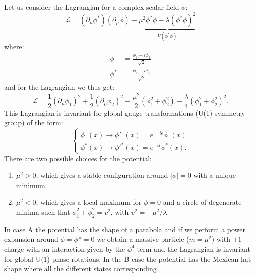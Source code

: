 Let us consider the Lagrangian for a complex scalar field $\phi$:
\begin{equation}
  \label{eq:25}
  \mathcal{L} = (\partial_{\mu} \phi^{*})(\partial_{\mu} \phi) -
  \underbrace{\mu^{2}\phi^{*}\phi - \lambda(\phi^{*}\phi)^{2}}_{V(\phi^{*}\phi)}
\end{equation}
where:
\begin{equation}
  \label{eq:26}
  \begin{split}
    \phi^{\phantom{*}} &= \frac{\phi_{1} + i \phi_{2}}{\sqrt{2}} \\
    \phi^{*} &= \frac{\phi_{1} - i \phi_{2}}{\sqrt{2}}
  \end{split}
\end{equation}
and for the Lagrangian we thus get:
\begin{equation}
  \label{eq:27}
  \mathcal{L} = \frac{1}{2} (\partial_{\mu} \phi_{1})^{2} +
  \frac{1}{2} ( \partial_{\mu} \phi_{2} )^{2} - \frac{\mu^{2}}{2} (
  \phi_{1}^{2} + \phi_{2}^{2} ) - \frac{\lambda}{4} ( \phi_{1}^{2} +
  \phi_{2}^{2} )^{2}.
\end{equation}
This Lagrangian is invariant for global gauge transformations (U(1) symmetry
group) of the form:
\begin{equation}
  \label{eq:28}
  \begin{cases}
    \phi^{\phantom{*}}(x) \rightarrow {\phi'}^{\phantom{*}}(x) = e^{\phantom{-} i
      \epsilon}
    \phi^{\phantom{*}}(x) \\
    \phi^{*} (x) \rightarrow {\phi'}^{*} (x) = e^{- i \epsilon} \phi^{*}(x).
  \end{cases}
\end{equation}
There are two possible choices for the potential:
\begin{enumerate}[A -]
\item $\mu^{2} > 0$, which gives a stable configuration around $|\phi| = 0$ with
  a unique minimum.
\item $\mu^{2} < 0$, which gives a local maximum for $\phi = 0$ and a circle of
  degenerate minima such that $\phi_{1}^{2} + \phi_{2}^{2} = v^{2}$, with
  $v^{2} = - \mu^{2} / \lambda$.
\end{enumerate}
In case A the potential has the shape of a parabola and if we perform a power
expansion around $\phi = \phi* = 0$ we obtain a massive particle ($m = \mu^2$)
with $\pm 1$ charge with an interaction given by the $\phi^4$ term and the
Lagrangian is invariant for global U(1) phase rotations. In the B case the
potential has the Mexican hat shape where all the different states corresponding
